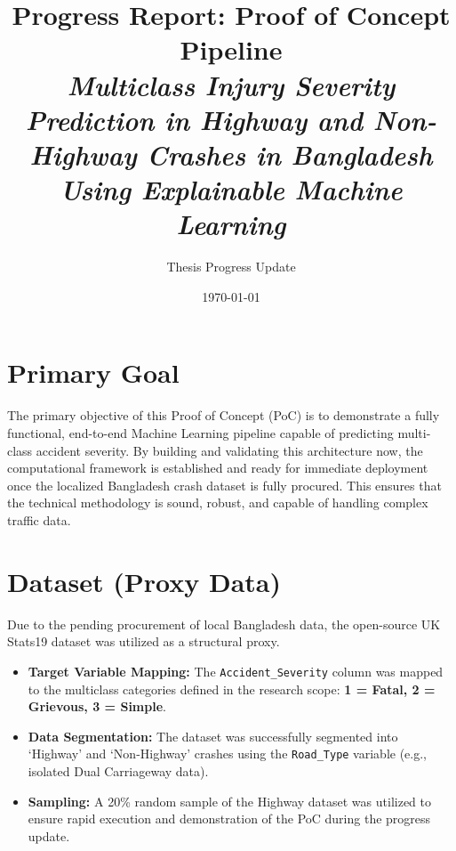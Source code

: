 \documentclass[11pt]{article}
\title{\textbf{Progress Report: Proof of Concept Pipeline} \\ 
\large \textit{Multiclass Injury Severity Prediction in Highway and Non-Highway Crashes in Bangladesh Using Explainable Machine Learning}}
\author{Thesis Progress Update}
\date{\today}
\begin{document}
\maketitle

\section{Primary Goal}
The primary objective of this Proof of Concept (PoC) is to demonstrate a fully functional, end-to-end Machine Learning pipeline capable of predicting multi-class accident severity. By building and validating this architecture now, the computational framework is established and ready for immediate deployment once the localized Bangladesh crash dataset is fully procured. This ensures that the technical methodology is sound, robust, and capable of handling complex traffic data.

\section{Dataset (Proxy Data)}
Due to the pending procurement of local Bangladesh data, the open-source UK Stats19 dataset was utilized as a structural proxy. 
\begin{itemize}
    \item \textbf{Target Variable Mapping:} The \texttt{Accident\_Severity} column was mapped to the multiclass categories defined in the research scope: \textbf{1 = Fatal, 2 = Grievous, 3 = Simple}.
    \item \textbf{Data Segmentation:} The dataset was successfully segmented into `Highway' and `Non-Highway' crashes using the \texttt{Road\_Type} variable (e.g., isolated Dual Carriageway data).
    \item \textbf{Sampling:} A 20\% random sample of the Highway dataset was utilized to ensure rapid execution and demonstration of the PoC during the progress update.
\end{itemize}
\end{document}
